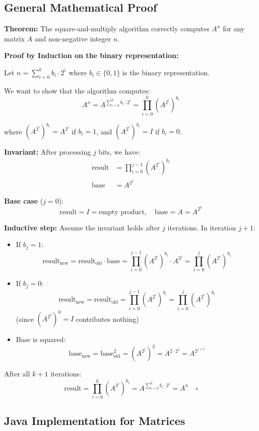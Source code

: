 \documentclass{article}
\begin{document}
	\subsection{General Mathematical Proof}
	
	\textbf{Theorem:} The square-and-multiply algorithm correctly computes $A^n$ for any matrix $A$ and non-negative integer $n$.
	
	\textbf{Proof by Induction on the binary representation:}
	
	Let $n = \sum_{i=0}^{k} b_i \cdot 2^i$ where $b_i \in \{0, 1\}$ is the binary representation.
	
	We want to show that the algorithm computes:
	\[
	A^n = A^{\sum_{i=0}^{k} b_i \cdot 2^i} = \prod_{i=0}^{k} (A^{2^i})^{b_i}
	\]
	
	where $(A^{2^i})^{b_i} = A^{2^i}$ if $b_i = 1$, and $(A^{2^i})^{b_i} = I$ if $b_i = 0$.
	
	\textbf{Invariant:} After processing $j$ bits, we have:
	\begin{align*}
		\text{result} &= \prod_{i=0}^{j-1} (A^{2^i})^{b_i} \\
		\text{base} &= A^{2^j}
	\end{align*}
	
	\textbf{Base case} ($j = 0$): 
	\[
	\text{result} = I = \text{empty product}, \quad \text{base} = A = A^{2^0}
	\]
	
	\textbf{Inductive step:} Assume the invariant holds after $j$ iterations. In iteration $j+1$:
	\begin{itemize}
		\item If $b_j = 1$: 
		\[
		\text{result}_{\text{new}} = \text{result}_{\text{old}} \cdot \text{base} = \prod_{i=0}^{j-1} (A^{2^i})^{b_i} \cdot A^{2^j} = \prod_{i=0}^{j} (A^{2^i})^{b_i}
		\]
		\item If $b_j = 0$:
		\[
		\text{result}_{\text{new}} = \text{result}_{\text{old}} = \prod_{i=0}^{j-1} (A^{2^i})^{b_i} = \prod_{i=0}^{j} (A^{2^i})^{b_i}
		\]
		(since $(A^{2^j})^0 = I$ contributes nothing)
		\item Base is squared:
		\[
		\text{base}_{\text{new}} = \text{base}_{\text{old}}^2 = (A^{2^j})^2 = A^{2 \cdot 2^j} = A^{2^{j+1}}
		\]
	\end{itemize}
	
	After all $k+1$ iterations:
	\[
	\text{result} = \prod_{i=0}^{k} (A^{2^i})^{b_i} = A^{\sum_{i=0}^{k} b_i \cdot 2^i} = A^n \quad \square
	\]
	
	\subsection{Java Implementation for Matrices}
	
\end{document}
